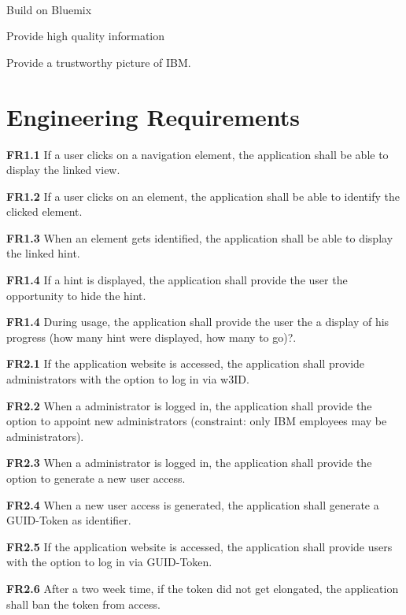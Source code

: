 \paragraph{}
\begin{closeItemCol}
    \item Build on Bluemix
    \item Provide high quality information
    \item Provide a trustworthy picture of IBM.
\end{closeItemCol}

\section{Engineering Requirements}
\begin{closeItem}
    \item [\textbf{FR1.1}] If a user clicks on a navigation element, the application shall be able to display the linked view.
    \item [\textbf{FR1.2}] If a user clicks on an element, the application shall be able to identify the clicked element.
    \item [\textbf{FR1.3}] When an element gets identified, the application shall be able to display the linked hint.
    \item [\textbf{FR1.4}] If a hint is displayed, the application shall provide the user the opportunity to hide the hint.
    \item [\textbf{FR1.4}] During usage, the application shall provide the user the a display of his progress (how many hint were displayed, how many to go)?.
\end{closeItem}

\begin{closeItem}
    \item [\textbf{FR2.1}] If the application website is accessed, the application shall provide administrators with the option to log in via w3ID.
    \item [\textbf{FR2.2}] When a administrator is logged in, the application shall provide the option to appoint new administrators (constraint: only IBM employees may be administrators).
    \item [\textbf{FR2.3}] When a administrator is logged in, the application shall provide the option to generate a new user access.
    \item [\textbf{FR2.4}] When a new user access is generated, the application shall generate a GUID-Token as identifier.
    \item [\textbf{FR2.5}] If the application website is accessed, the application shall provide users with the option to log in via GUID-Token.
    \item [\textbf{FR2.6}] After a two week time, if the token did not get elongated, the application shall ban the token from access.
\end{closeItem}

